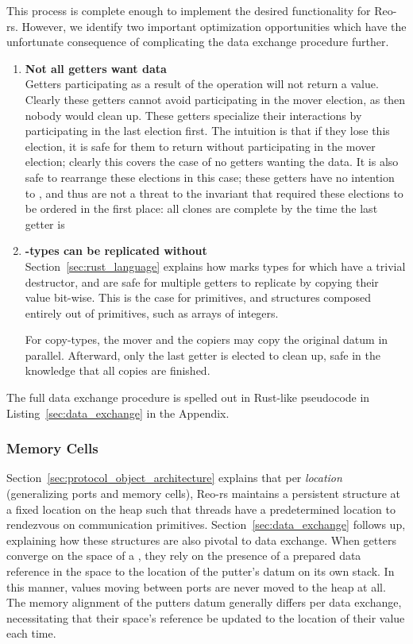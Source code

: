 This process is complete enough to implement the desired functionality for \mbox{Reo-rs}. However, we identify two important optimization opportunities which have the unfortunate consequence of complicating the data exchange procedure further.
\begin{enumerate}
	\item \textbf{Not all getters want data}\\
	Getters participating as a result of the  operation will not return a value. Clearly these getters cannot avoid participating in the mover election, as then nobody would clean up. These getters specialize their interactions by participating in the last election first. The intuition is that if they lose this election, it is safe for them to return without participating in the mover election; clearly this covers the case of no getters wanting the data. It is also safe to rearrange these elections in this case; these getters have no intention to , and thus are not a threat to the invariant that required these elections to be ordered in the first place: all clones are complete by the time the last getter is
	
	\item \textbf{-types can be replicated without }\\
	Section~\ref{sec:rust_language} explains how  marks types for which have a trivial destructor, and are safe for multiple getters to replicate by copying their value bit-wise. This is the case for primitives, and structures composed entirely out of primitives, such as arrays of integers. 
	
	For copy-types, the mover and the copiers may copy the original datum in parallel. Afterward, only the last getter is elected to clean up, safe in the knowledge that all copies are finished.
\end{enumerate}

The full data exchange procedure is spelled out in Rust-like pseudocode in Listing~\ref{sec:data_exchange} in the Appendix.

\subsubsection{Memory Cells}
\label{sec:memory_cells}
Section~\ref{sec:protocol_object_architecture} explains that per \textit{location} (generalizing ports and memory cells), Reo-rs maintains a persistent  structure at a fixed location on the heap such that threads have a predetermined location to rendezvous on communication primitives. Section~\ref{sec:data_exchange} follows up, explaining how these structures are also pivotal to data exchange. When getters converge on the space of a , they rely on the presence of a prepared data reference in the space to the location of the putter's datum on its own stack. In this manner, values moving between ports are never moved to the heap at all. The memory alignment of the putters datum generally differs per data exchange, necessitating that their space's reference be updated to the location of their value each time. 

